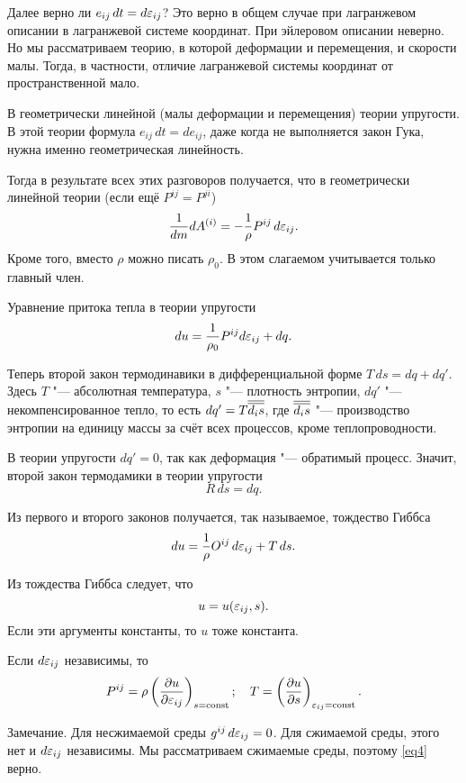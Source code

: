 Далее верно ли $e_{ij} \,dt = d\varepsilon_{ij}$? Это верно в общем случае при лагранжевом описании в лагранжевой системе координат. При эйлеровом описании неверно. Но мы рассматриваем теорию, в которой деформации и перемещения, и скорости малы. Тогда, в частности, отличие лагранжевой системы координат от пространственной мало.

В геометрически линейной (малы деформации и перемещения) теории упругости. В этой теории формула $e_{ij}\,dt = de_{ij}$, даже когда не выполняется закон Гука, нужна именно геометрическая линейность.

Тогда в результате всех этих разговоров получается, что в геометрически линейной теории (если ещё $P^{ij}= P^{ji}$)
\[
  \frac1{dm} dA^{(i)} = -\frac1\rho P^{ij}\,d\varepsilon_{ij}.
\]
Кроме того, вместо $\rho$ можно писать $\rho_0$. В этом слагаемом учитывается только главный член.

Уравнение притока тепла в теории упругости
\begin{equation}
  du = \frac1{\rho_0} P^{ij} d\varepsilon_{ij} + dq.\label{1zt}
\end{equation}

Теперь второй закон термодинавики в дифференциальной форме $T\,ds = dq + dq'$. Здесь $T$ "--- абсолютная температура, $s$ "--- плотность энтропии, $dq'$ "--- некомпенсированное тепло, то есть $dq' = T\overline{\overline{d_is}}$, где $\overline{\overline{d_is}}$ "--- производство энтропии на единицу массы за счёт всех процессов, кроме теплопроводности.

В теории упругости $dq'=0$, так как деформация "--- обратимый процесс. Значит, второй закон термодамики в теории упругости 
\begin{equation}
R\,ds = dq.\label{2zt}
\end{equation}


Из первого и второго законов получается, так называемое, тождество Гиббса
\begin{equation}
  du = \frac1\rho O^{ij}\,d\varepsilon_{ij} + T\,ds.
\label{tg}
\end{equation}

Из тождества Гиббса следует, что
\[
  u = u(\varepsilon_{ij},s).
\]
Если эти аргументы константы, то $u$ тоже константа.

Если $d\varepsilon_{ij}$ независимы, то 
\begin{equation}
  P^{ij} = \rho\left( \frac{\partial u}{\partial \varepsilon_{ij}} \right)_{s=\operatorname{const}};\quad
  T = \left( \frac{\partial u}{\partial s} \right)_{\varepsilon_{ij}=\operatorname{const}}. \label{eq4}
\end{equation}

Замечание. Для несжимаемой среды $g^{ij}\,d\varepsilon_{ij} = 0$. Для сжимаемой среды, этого нет и $d\varepsilon_{ij}$ независимы. Мы рассматриваем сжимаемые среды, поэтому \eqref{eq4} верно.

